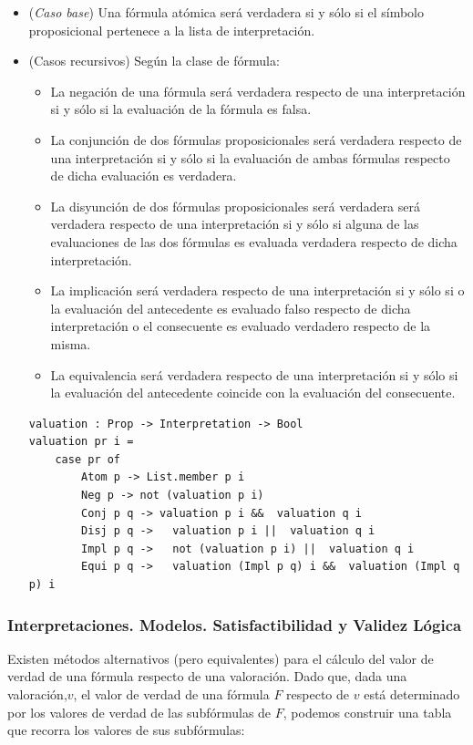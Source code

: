 \documentclass[a4paper]{report}
\begin{document}
\begin{itemize}
\item (\textit{Caso base}) Una fórmula atómica será verdadera si y sólo si el símbolo proposicional pertenece a la lista de interpretación.
\item (Casos recursivos) Según la clase de fórmula:
\begin{itemize}
\item La negación de una fórmula será verdadera respecto de una interpretación si y sólo si la evaluación de la fórmula es falsa.
\item La conjunción de dos fórmulas proposicionales será verdadera respecto de una interpretación si y sólo si la evaluación de ambas fórmulas respecto de dicha evaluación es verdadera.
\item La disyunción de dos fórmulas proposicionales será verdadera será verdadera respecto de una interpretación si y sólo si alguna de las evaluaciones de las dos fórmulas es evaluada verdadera respecto de dicha interpretación.
\item La implicación será verdadera respecto de una interpretación si y sólo si o la evaluación del antecedente es evaluado falso respecto de dicha interpretación o el consecuente es evaluado verdadero respecto de la misma.
\item La equivalencia será verdadera respecto de una interpretación si y sólo si la evaluación del antecedente coincide con la evaluación del consecuente.\\
\end{itemize} 

\begin{lstlisting}[caption= {Función de valoración de las fórmulas proposicionales}]
valuation : Prop -> Interpretation -> Bool
valuation pr i =
    case pr of
        Atom p -> List.member p i
        Neg p -> not (valuation p i)
        Conj p q -> valuation p i &&  valuation q i
        Disj p q ->   valuation p i ||  valuation q i
        Impl p q ->   not (valuation p i) ||  valuation q i
        Equi p q ->   valuation (Impl p q) i &&  valuation (Impl q p) i
\end{lstlisting}
\end{itemize}

\subsubsection{Interpretaciones. Modelos. Satisfactibilidad y Validez Lógica}

Existen métodos alternativos (pero equivalentes) para el cálculo del valor de verdad de una fórmula respecto de una valoración. Dado que, dada una valoración,$v$, el valor de verdad de una fórmula $F$ respecto de $v$ está determinado por los valores de verdad de las subfórmulas de $F$, podemos construir una tabla que recorra los valores de sus subfórmulas:
\end{document}
